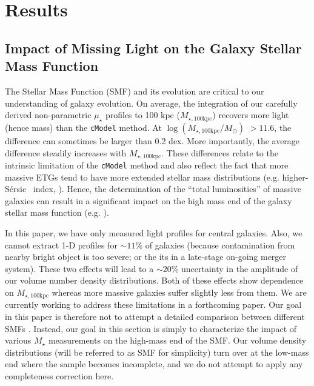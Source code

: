 \documentclass[a4paper,fleqn,usenatbib]{mnras}
\def\ser{{S\'{e}rsic\ }}
\def\mstar{{$M_{\star}$}}
\def\mtot{{$M_{\star,100\mathrm{kpc}}$}}
\def\logmtot{{$\log (M_{\star,100\mathrm{kpc}}/M_{\odot})$}}
\def\m2l{{$M_{\star}/L_{\star}$}}
\def\mden{{$\mu_{\star}$}}
\begin{document}
\section{Results}
    \label{sec:result}

\subsection{Impact of Missing Light on the Galaxy Stellar Mass Function}
    \label{ssec:smf}
    
    The Stellar Mass Function (SMF) and its evolution are critical to our understanding 
    of galaxy evolution. 
    On average, the integration of our carefully derived non-parametric \mden{} profiles 
    to 100 kpc (\mtot{}) recovers more light (hence mass) than the \texttt{cModel} method. 
    At \logmtot{} $>11.6$, the difference can sometimes be larger than 0.2 dex. 
    More importantly, the average difference steadily increases with \mtot{}. 
    These differences relate to the intrinsic limitation of the \texttt{cModel} 
    method and also reflect the fact that more massive ETGs tend to have more 
    extended stellar mass distributions (e.g. higher-\ser{} index, 
    \citealt{Graham2003}). Hence, the determination of the ``total luminosities'' of 
    massive galaxies can result in a significant impact on the high mass end of the 
    galaxy stellar mass function (e.g. \citealt{Bernardi2013, DSouza2014, DSouza2015,
    Bernardi2017}).
    
    
    In this paper, we have only measured light profiles for central galaxies. 
    Also, we cannot extract 1-D profiles for $\sim 11$\% of galaxies (because 
    contamination from nearby bright object is too severe; or the its in a late-stage
    on-going merger system). 
    These two effects will lead to a ${\sim}20$\% uncertainty in the amplitude of 
    our volume number density distributions. 
    Both of these effects show dependence on \mtot{} whereas more massive galaxies 
    suffer slightly less from them.
    We are currently working to address these limitations in a forthcoming paper. 
    Our goal in this paper is therefore not to attempt a detailed comparison between 
    different SMFs \citep[e.g.,][]{Bernardi2013, Bernardi2017}. 
    Instead, our goal in this section is simply to characterize the impact of various 
    \mstar{} measurements on the high-mass end of the SMF.   
    Our volume density distributions (will be referred to as SMF for simplicity) 
    turn over at the low-mass end where the sample becomes incomplete, and we do not 
    attempt to apply any completeness correction here.  
    
\end{document}
